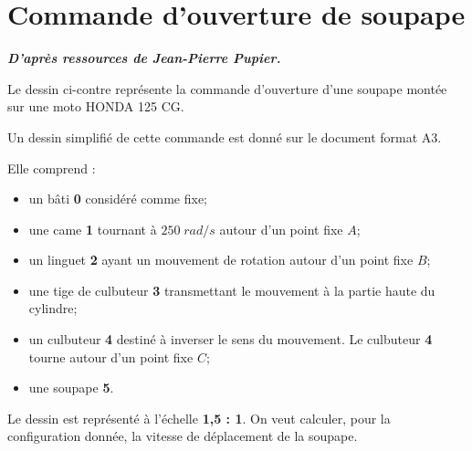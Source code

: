 \documentclass[10pt,fleqn]{article} %
\begin{document}
\newpage
\section{Commande d'ouverture de soupape}
\begin{flushright}
\textbf{\textit{D'après ressources de Jean-Pierre Pupier.}}
\end{flushright} 
\setcounter{exo}{0}

\begin{minipage}[c]{.5\linewidth}

Le dessin ci-contre représente la commande d'ouverture d'une soupape montée sur une moto HONDA 125 CG.

Un dessin simplifié de cette commande est donné sur le document format A3.

Elle comprend :
\begin{itemize}
\item un bâti \textbf{0} considéré comme fixe;
\item une came \textbf{1} tournant à $250\; rad/s$ autour d'un point fixe $A$;
\item un linguet \textbf{2} ayant un mouvement de rotation autour d'un point fixe $B$;
\item une tige de culbuteur \textbf{3} transmettant le mouvement à la partie haute du cylindre;
\item un culbuteur \textbf{4} destiné à inverser le sens du mouvement. Le culbuteur \textbf{4} tourne autour d'un point fixe $C$;
\item une soupape \textbf{5}.
\end{itemize}

Le dessin est représenté à l'échelle \textbf{1,5 : 1}. On veut calculer, pour la configuration donnée, la vitesse de déplacement de la soupape.

\end{minipage}\hfill
\end{document}
